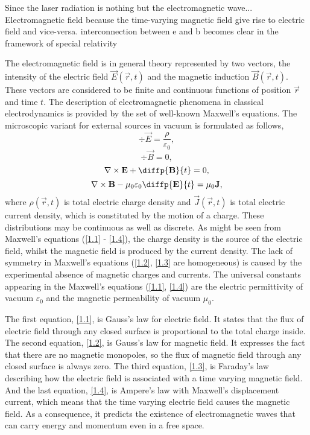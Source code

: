 Since the laser radiation is nothing but the electromagnetic wave...
Electromagnetic field because the time-varying magnetic field give rise to electric field and vice-versa. interconnection between e and b becomes clear in the framework of special relativity

The electromagnetic field is in general theory represented by two vectors, the intensity of the electric field $ \vec{E}\left( \vec{r}, t \right) $ and the magnetic induction $ \vec{B}\left( \vec{r}, t \right) $. These vectors are considered to be finite and continuous functions of position $ \vec{r} $ and time $ t $. The description of electromagnetic phenomena in classical electrodynamics is provided by the set of well-known Maxwell's equations. The microscopic variant for external sources in vacuum is formulated as follows,
\begin{equation}
\label{1.1}
\div{\vec{E}} = \frac{\rho}{\varepsilon_0},
\end{equation}
\begin{equation}
\label{1.2}
\div{\vec{B}} = 0,
\end{equation}
\begin{equation}
\label{1.3}
\rot{\vec{E}} + \diffp{\vec{B}}{t} = 0,
\end{equation}
\begin{equation}
\label{1.4}
\rot{\vec{B}} - \mu_0 \varepsilon_0 \diffp{\vec{E}}{t}= \mu_0 \vec{J},
\end{equation}
where $ \rho\left( \vec{r}, t \right) $ is total electric charge density and $ \vec{J}\left( \vec{r}, t \right) $ is total electric current density, which is constituted by the motion of a charge. These distributions may be continuous as well as discrete. As might be seen from Maxwell's equations (\ref{1.1} - \ref{1.4}), the charge density is the source of the electric field, whilst the magnetic field is produced by the current density. The lack of symmetry in Maxwell's equations (\ref{1.2}, \ref{1.3} are homogeneous) is caused by the experimental absence of magnetic charges and currents. The universal constants appearing in the Maxwell's equations (\ref{1.1}, \ref{1.4}) are the electric permittivity of vacuum $ \varepsilon_0 $ and the magnetic permeability of vacuum $ \mu_0 $.

The first equation, \ref{1.1}, is Gauss's law for electric field. It states that the flux of electric field through any closed surface is proportional to the total charge inside. The second equation, \ref{1.2}, is Gauss's law for magnetic field. It expresses the fact that there are no magnetic monopoles, so the flux of magnetic field through any closed surface is always zero. The third equation, \ref{1.3}, is Faraday's law describing how the electric field is associated with a time varying magnetic field. And the last equation, \ref{1.4}, is Ampere's law with Maxwell's displacement current, which means that the time varying electric field causes the magnetic field. As a consequence, it predicts the existence of electromagnetic waves that can carry energy and momentum even in a free space.

